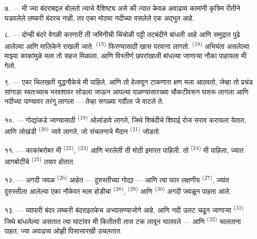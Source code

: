 \VUsaut{3.0mm}
\VUsaut{3.0mm}

७. --- मी ज्या बंदराबद्दल बोलतो त्याचे वैशिष्ट्य असे की त्यात केवळ अवाढव्य कामांनी कृत्रिम
रीतीने घडवलेले लष्करी बंदरच नाही, तर एका मोठ्या नदीच्या  वसलेले एक अद्भुत
 आहे.

८. --- दोन्ही बंदरे वेगळी करणारी ती जमिनीची चिंचोळी पट्टी तटबंदीने बांधली आहे आणि समुद्रात
पुढे आलेल्या  आणि  मालिकेने राखली जाते.
 \textsuperscript{(15)} फिरण्यासाठी खास परवाना लागतो.
 \textsuperscript{(18)} अभियंता असलेल्या माझ्या काकांमुळे मला तो
सहज मिळाला, आणि विस्तीर्ण छपरांखाली बांधल्या जाणाऱ्या नौका पाहायला मी गेलो.

९. --- एका चिलखती युद्धनौकेचे  मी पाहिले, आणि तो हेलावून टाकणारा क्षण मला
आठवतो, जेव्हा तो प्रचंड सांगाडा स्वतःच्याच भरवशावर सोडला जाऊन आपल्या पाळण्यासारख्या चौकटीवरून
घसरू लागला आणि नदीच्या पाण्यावर तरंगू लागला — तेव्हा सगळ्या गर्दीला जे वाटले ते.

१०. --- गोद्यांकडे जाण्यासाठी  \textsuperscript{(19)} ओलांडावे लागते,
जिथे शिबंदीचे शिपाई रोज सराव करायला येतात, आणि लोखंडी  \textsuperscript{(20)}
जावे लागते, जो संचलनाचे मैदान  \textsuperscript{(21)} जोडतो.

\VUsaut{3.0mm}
\VUsaut{3.0mm}

११. --- काकांबरोबर मी  \textsuperscript{(22)}, 
\textsuperscript{(23)} आणि  भरलेली ती मोठी इमारत पाहिली. तो
 \textsuperscript{(24)} मी पाहिला, ज्यात आगबोटींचे 
\textsuperscript{(25)} तयार होतात.

१२. --- अगदी जवळ  \textsuperscript{(26)} आहेत --- दुरुस्तीच्या गोद्या --- आणि
त्या फार लक्षणीय  \textsuperscript{(27)}, ज्यांत दुरुस्तीला आलेल्या
एका नौकेवर मला होडीचा  \textsuperscript{(28)}, 
\textsuperscript{(29)} आणि  \textsuperscript{(30)} अगदी जवळून पाहता आले.

१३. --- व्यापारी बंदर लष्करी बंदराइतकेच अभ्यासण्याजोगे आहे, आणि नदी उलट चढून जाणाऱ्या
 \textsuperscript{(31)} जिथे बांधलेल्या असतात त्या घाटांवर मी कितीतरी
तास टक लावून घालवले — आणि  \textsuperscript{(32)} चालताना पाहत,
ज्या अवाढव्य ओझी पिसासारखी उचलतात.

